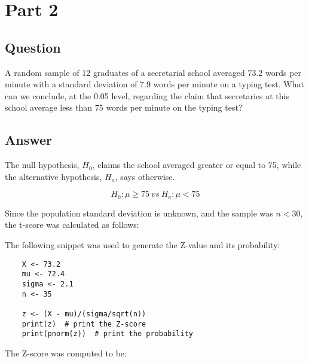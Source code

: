 \section{Part 2}
    \subsection{Question}
    A random sample of 12 graduates of a secretarial school averaged 73.2 words per minute with a standard deviation of 7.9 words per minute on a typing test. What can we conclude, at the 0.05 level, regarding the claim that secretaries at this school average less than 75 words per minute on the typing test?

    \subsection{Answer}
    The null hypothesis, $H_{0}$, claims the school averaged greater or equal to 75, while the alternative hypothesis, $H_{a}$, says otherwise.

        \[ H_{0}: \mu \geq 75 \ vs \ H_{a}: \mu < 75 \]

    Since the population standard deviation is unknown, and the sample was $n < 30$, the t-score was calculated as follows:

        

    The following snippet was used to generate the Z-value and its probability:
\begin{lstlisting}
    X <- 73.2
    mu <- 72.4
    sigma <- 2.1
    n <- 35

    z <- (X - mu)/(sigma/sqrt(n))
    print(z)  # print the Z-score
    print(pnorm(z))  # print the probability
\end{lstlisting}

    The Z-score was computed to be:

        
